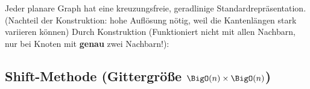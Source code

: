 Jeder planare Graph hat eine kreuzungsfreie, geradlinige Standardrepräsentation. (Nachteil der Konstruktion: hohe Auflösung nötig, weil die Kantenlängen stark variieren können)
		\ProofIdea
		\vspace*{-0.5\baselineskip}
		Durch Konstruktion (Funktioniert nicht mit allen Nachbarn, nur bei Knoten mit \textbf{genau} zwei Nachbarn!):\\
		\hspace*{-1cm}\begin{minipage}{0.27\textwidth}
			
		\end{minipage}
		\hspace*{0.5cm}\begin{minipage}{0.21\textwidth}
			
		\end{minipage}
		\hspace*{-0.3cm}\begin{minipage}{0.23\textwidth}
			
		\end{minipage}
		\begin{minipage}{0.23\textwidth}
			
		\end{minipage}
\topbreak
\vspace*{-2\baselineskip}
\subsection{Shift-Methode (Gittergröße $\BigO(n)\times\BigO(n)$)}
